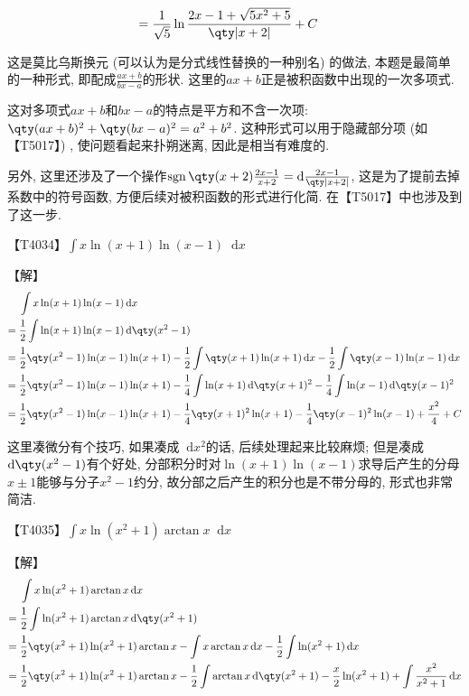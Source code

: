 \documentclass{ctexbook}
\DeclareMathOperator{\sgn}{sgn}
\newcommand*{\dif}{\mathop{}\!\mathrm{d}}
\begin{document}
{\begin{align*}
={}&\frac{1}{\sqrt{5}}\ln\frac{2x-1+\sqrt{5x^{2}+5}}{\qty|x+2|}+C
\end{align*}\par
{\kaishu 这是莫比乌斯换元 (可以认为是分式线性替换的一种别名) 的做法, 本题是最简单的一种形式, 即配成$\frac{ax+b}{bx-a}$的形状. 这里的$ax+b$正是被积函数中出现的一次多项式. \par
这对多项式$ax+b$和$bx-a$的特点是平方和不含一次项: $\qty(ax+b)^{2}+\qty(bx-a)^{2}=a^{2}+b^{2}$. 这种形式可以用于隐藏部分项 (如【T5017】) , 使问题看起来扑朔迷离, 因此是相当有难度的. \par
另外, 这里还涉及了一个操作$\sgn{\qty(x+2)}\frac{2x-1}{x+2}=\dif{\frac{2x-1}{\qty|x+2|}}$, 这是为了提前去掉系数中的符号函数, 方便后续对被积函数的形式进行化简. 在【T5017】中也涉及到了这一步. \par}
【T4034】$\int x\ln(x+1)\ln(x-1)\dif{x}$\par
【解】
\begin{align*}
{}&\int x\ln(x+1)\ln(x-1)\dif{x}\\
={}&\frac{1}{2}\int\ln(x+1)\ln(x-1)\dif{\qty(x^{2}-1)}\\
={}&\frac{1}{2}\qty(x^{2}-1)\ln(x-1)\ln(x+1)-\frac{1}{2}\int\qty(x+1)\ln(x+1)\dif{x}-\frac{1}{2}\int\qty(x-1)\ln(x-1)\dif{x}\\
={}&\frac{1}{2}\qty(x^{2}-1)\ln(x-1)\ln(x+1)-\frac{1}{4}\int\ln(x+1)\dif{\qty(x+1)^{2}}-\frac{1}{4}\int\ln(x-1)\dif{\qty(x-1)^{2}}\\
={}&\frac{1}{2}\qty(x^{2}-1)\ln(x-1)\ln(x+1)-\frac{1}{4}\qty(x+1)^{2}\ln(x+1)-\frac{1}{4}\qty(x-1)^{2}\ln(x-1)+\frac{x^{2}}{4}+C
\end{align*}\par
{\kaishu 这里凑微分有个技巧, 如果凑成$\dif{x^{2}}$的话, 后续处理起来比较麻烦; 但是凑成$\dif{\qty(x^{2}-1)}$有个好处, 分部积分时对$\ln(x+1)\ln(x-1)$求导后产生的分母$x\pm1$能够与分子$x^{2}-1$约分, 故分部之后产生的积分也是不带分母的, 形式也非常简洁. \par}
【T4035】$\int x\ln(x^{2}+1)\arctan{x}\dif{x}$\par
【解】
\begin{align*}
{}&\int x\ln(x^{2}+1)\arctan{x}\dif{x}\\
={}&\frac{1}{2}\int\ln(x^{2}+1)\arctan{x}\dif{\qty(x^{2}+1)}\\
={}&\frac{1}{2}\qty(x^{2}+1)\ln(x^{2}+1)\arctan{x}-\int x\arctan{x}\dif{x}-\frac{1}{2}\int\ln(x^{2}+1)\dif{x}\\
={}&\frac{1}{2}\qty(x^{2}+1)\ln(x^{2}+1)\arctan{x}-\frac{1}{2}\int\arctan{x}\dif{\qty(x^{2}+1)}-\frac{x}{2}\ln(x^{2}+1)+\int\frac{x^{2}}{x^{2}+1}\dif{x}\\

\end{align*}}
\end{document}
